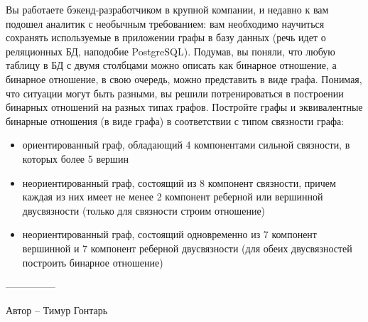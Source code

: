 \question
Вы работаете бэкенд-разработчиком в крупной компании, и недавно к вам подошел аналитик с необычным требованием: вам необходимо научиться сохранять используемые в приложении графы в базу данных (речь идет о реляционных БД, наподобие PostgreSQL). Подумав, вы поняли, что любую таблицу в БД с двумя столбцами можно описать как бинарное отношение, а бинарное отношение, в свою очередь, можно представить в виде графа. Понимая, что ситуации могут быть разными, вы решили потренироваться в построении бинарных отношений на разных типах графов. Постройте графы и эквивалентные бинарные отношения (в виде графа) в соответствии с типом связности графа:

\begin{itemize}
\item ориентированный граф, обладающий 4 компонентами сильной связности, в которых более 5 вершин
\item неориентированный граф, состоящий из 8 компонент связности, причем каждая из них имеет не менее 2 компонент реберной или вершинной двусвязности (только для связности строим отношение)
\item неориентированный граф, состоящий одновременно из 7 компонент вершинной и 7 компонент реберной двусвязности (для обеих двусвязностей построить бинарное отношение)
\end{itemize}

---------------

Автор -- Тимур Гонтарь